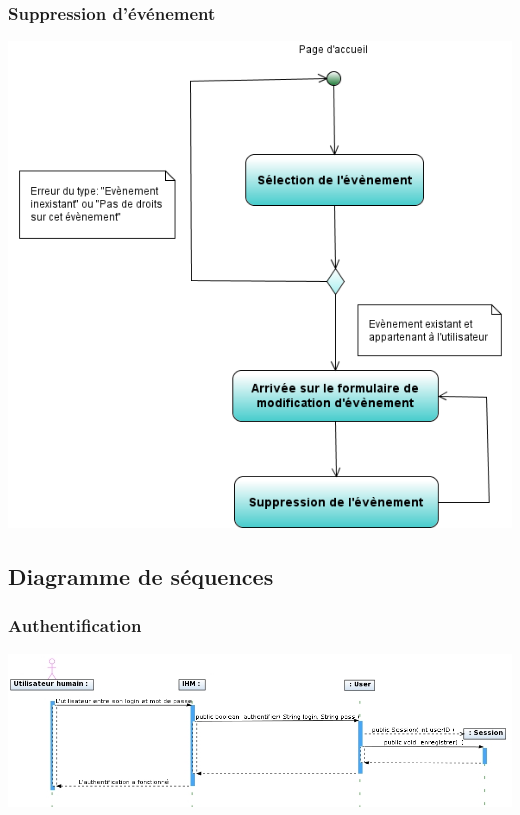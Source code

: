 \documentclass[12pt , a4paper]{article}
\begin{document}
\subsubsection{Suppression d'événement}
\begin{center}
  \includegraphics[scale=0.6]{./images/diag_act_suppression_evenement.png}
\end{center}

\subsection{Diagramme de séquences}
\begin{landscape}
\subsubsection{Authentification}
\begin{center}
  \includegraphics[scale=0.55]{./images/diag_seq_authentification.jpg}
\end{center}
\end{landscape}
\end{document}
